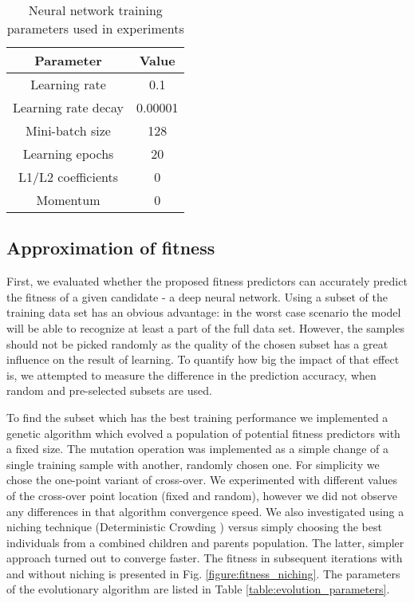 \documentclass{llncs}
\begin{document}
\begin{table}

    \center
    \begin{tabular}{|c|c|}
        \hline
        Parameter & Value \\
        \hline
        Learning rate & 0.1 \\
        Learning rate decay & 0.00001 \\
        Mini-batch size & 128 \\  
        Learning epochs & 20 \\
        L1/L2 coefficients & 0 \\
        Momentum & 0 \\
        \hline
    \end{tabular}

    \caption{Neural network training parameters used in experiments}
    \label{table:dnn_learning_parameters}

\end{table}

\subsection{Approximation of fitness}

First, we evaluated whether the proposed fitness predictors can accurately predict the fitness of a given candidate - a deep neural network. Using a subset of the training data set has an obvious advantage: in the worst case scenario the model will be able to recognize at least a part of the full data set. However, the samples should not be picked randomly as the quality of the chosen subset has a great influence on the result of learning. To quantify how big the impact of that effect is, we attempted to measure the difference in the prediction accuracy, when random and pre-selected subsets are used. 

To find the subset which has the best training performance we implemented a genetic algorithm which evolved a population of potential fitness predictors with a fixed size. The mutation operation was implemented as a simple change of a single training sample with another, randomly chosen one. For simplicity we chose the one-point variant of cross-over. We experimented with different values of the cross-over point location (fixed and random), however we did not observe any differences in that algorithm convergence speed. We also investigated using a niching technique (Deterministic Crowding \cite{Mengshoel2008}) versus simply choosing the best individuals from a combined children and parents population. The latter, simpler approach turned out to converge faster. The fitness in subsequent iterations with and without niching is presented in Fig. \ref{figure:fitness_niching}. The parameters of the evolutionary algorithm are listed in Table \ref{table:evolution_parameters}.
\end{document}
